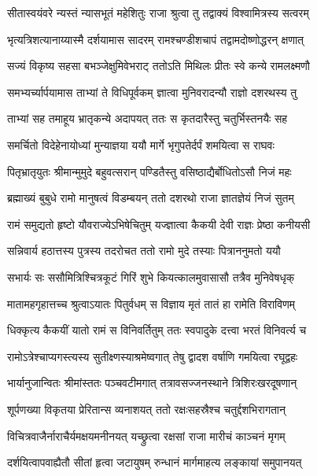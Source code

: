 \twolineshloka
{सीतास्वयंवरे न्यस्तं न्यासभूतं महेशितुः}
{राजा श्रुत्वा तु तद्वाक्यं विश्वामित्रस्य सत्वरम्}%

\twolineshloka
{भृत्यत्रिशत्यानाय्यास्मै दर्शयामास सादरम्}
{रामश्चण्डीशचापं तद्वामदोष्णोद्धरन् क्षणात्}%

\twolineshloka
{सज्यं विकृष्य सहसा बभञ्जेक्षुमिवेभराट्}
{ततोऽति मिथिलः प्रीतः स्वे कन्ये रामलक्ष्मणौ}%

\twolineshloka
{समभ्यर्च्यार्पयामास ताभ्यां ते विधिपूर्वकम्}
{ज्ञात्वा मुनिवरादन्यौ राज्ञो दशरथस्य तु}%

\twolineshloka
{ताभ्यां सह तमाहूय भ्रातृकन्ये अदापयत्}
{ततः स कृतदारैस्तु चतुर्भिस्तनयैः सह}%

\twolineshloka
{समर्चितो विदेहेनायोध्यां मुन्याज्ञया ययौ}
{मार्गे भृगुपतेर्दर्पं शमयित्वा स राघवः}%

\twolineshloka
{पितृभ्रातृयुतः श्रीमान्मुमुदे बहुवत्सरान्}
{पण्डितैस्तु वसिष्ठाद्यैर्बोधितोऽसौ निजं महः}%

\twolineshloka
{ब्रह्माख्यं बुबुधे रामो मानुषत्वं विडम्बयन्}
{ततो दशरथो राजा ज्ञातज्ञेयं निजं सुतम्}%

\twolineshloka
{रामं समुद्यतो हृष्टो यौवराज्येऽभिषेचितुम्}
{यज्ज्ञात्वा कैकयी देवी राज्ञः प्रेष्ठा कनीयसी}%

\twolineshloka
{सन्निवार्य हठात्तस्य पुत्रस्य तदरोचत}
{ततो रामो मुदे तस्याः पित्राननुमतो ययौ}%

\twolineshloka
{सभार्यः सः ससौमित्रिश्चित्रकूटं गिरिं शुभे}
{कियत्कालमुवासासौ तत्रैव मुनिवेषधृक्}%

\twolineshloka
{मातामहगृहात्तच्च श्रुत्वाऽयातः पितुर्वधम्}
{स विज्ञाय मृतं तातं हा रामेति विराविणम्}%

\twolineshloka
{धिक्कृत्य कैकयीं यातो रामं स विनिवर्तितुम्}
{ततः स्वपादुके दत्त्वा भरतं विनिवर्त्य च}%

\twolineshloka
{रामोऽत्रेश्चाप्यगस्त्यस्य सुतीक्ष्णस्याश्रमेष्वगात्}
{तेषु द्वादश वर्षाणि गमयित्वा रघूद्वहः}%

\twolineshloka
{भार्यानुजान्वितः श्रीमांस्ततः पञ्चवटीमगात्}
{तत्रावसज्जनस्थाने त्रिशिरःखरदूषणान्}%

\twolineshloka
{शूर्पणख्या विकृतया प्रेरितान्स व्यनाशयत्}
{ततो रक्षःसहस्रैश्च चतुर्द्दशभिरागतान्}%

\twolineshloka
{विचित्रवाजैर्नाराचैर्यमक्षयमनीनयत्}
{यच्छ्रुत्वा रक्षसां राजा मारीचं काञ्चनं मृगम्}%

\twolineshloka
{दर्शयित्वापवाह्यैतौ सीतां हृत्वा जटायुषम्}
{रुन्धानं मार्गमाहत्य लङ्कायां समुपानयत्}%

